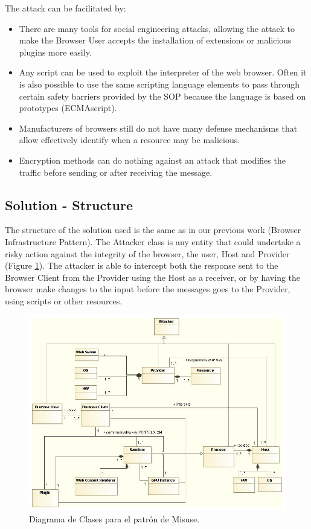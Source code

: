 \documentclass{sig-alternate-05-2015}
\begin{document}
The attack can be facilitated by:
\begin{itemize}
  \item There are many tools for social engineering attacks, allowing the attack to make the Browser User accepts the installation of extensions or malicious plugins more easily.
  \item Any script can be used to exploit the interpreter of the web browser. Often it is also possible to use the same scripting language elements to pass through certain safety barriers provided by the SOP because the language is based on prototypes (ECMAscript).
  \item Manufacturers of browsers still do not have many defense mechanisms that allow effectively identify when a resource may be malicious.
  \item Encryption methods can do nothing against an attack that modifies the traffic before sending or after receiving the message.
\end{itemize}
\subsection{Solution - Structure}
The structure of the solution used is the same as in our previous work (Browser Infrastructure Pattern). The Attacker class is any entity that could undertake a risky action against the integrity of the browser, the user, Host and Provider (Figure \ref{fig:BIMisuse}). The attacker is able to intercept both the response sent to the Browser Client from the Provider using the Host as a receiver, or by having the browser make changes to the input before the messages goes to the Provider, using scripts or other resources.  

\begin{figure}[h!t]
  \centering
  \includegraphics[scale=0.55]{figures/patronMisuse_v2.jpg}
  \caption{Diagrama de Clases para el patrón de Misuse.}
  \label{fig:BIMisuse}
\end{figure}
\end{document}
